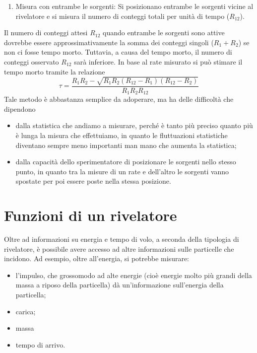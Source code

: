 \begin{esempio}
\begin{enumerate}[leftmargin=0.5cm]
      \item Misura con entrambe le sorgenti: Si posizionano entrambe le sorgenti vicine al rivelatore e si misura il numero di conteggi totali per unità di tempo ($R_{12}$).
   \end{enumerate}
   Il numero di conteggi attesi $R_{12}$ quando entrambe le sorgenti sono attive dovrebbe essere approssimativamente la somma dei conteggi singoli ($R_1 + R_2$) se non ci fosse tempo morto. Tuttavia, a causa del tempo morto, il numero di conteggi osservato $R_{12}$ sarà inferiore. In base al rate misurato si può stimare il tempo morto tramite la relazione
   \begin{equation*}
      \tau=\frac{R_1R_2 - \sqrt{R_1R_2( R_{12} - R_1 )( R_{12} - R_2 )}}{R_1R_2R_{12}}
   \end{equation*}
   Tale metodo è abbastanza semplice da adoperare, ma ha delle difficoltà che dipendono
   \begin{itemize}[leftmargin=0.5cm]
      \item dalla statistica che andiamo a misurare, perché è tanto più preciso quanto più è lunga la misura che effettuiamo, in quanto le fluttuazioni statistiche diventano sempre meno importanti man mano che aumenta la statistica;
      \item dalla capacità dello sperimentatore di posizionare le sorgenti nello stesso punto, in quanto tra la misure di un rate e dell'altro le sorgenti vanno spostate per poi essere poste nella stessa posizione.
   \end{itemize}
\end{esempio}

\section{Funzioni di un rivelatore}

Oltre ad informazioni su energia e tempo di volo, a seconda della tipologia di rivelatore, è possibile avere accesso ad altre informazioni sulle particelle che incidono. Ad esempio, oltre all'energia, si potrebbe misurare:

\begin{itemize}
   \item l'impulso, che grossomodo ad alte energie (cioè energie molto più grandi della massa a riposo della particella) dà un'informazione sull'energia della particella;
   \item carica;
   \item massa
   \item tempo di arrivo.
\end{itemize}

